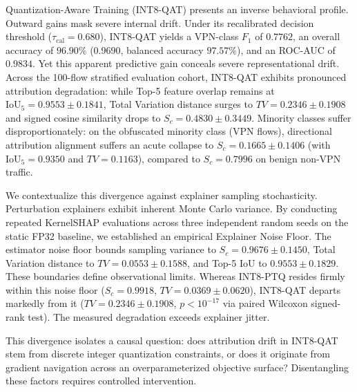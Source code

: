 \documentclass[conference]{IEEEtran}
\begin{document}
Quantization-Aware Training (INT8-QAT) presents an inverse behavioral profile. Outward gains mask severe internal drift. Under its recalibrated decision threshold ($\tau_{\text{cal}} = 0.680$), INT8-QAT yields a VPN-class $F_1$ of $0.7762$, an overall accuracy of $96.90\%$ ($0.9690$, balanced accuracy $97.57\%$), and an ROC-AUC of $0.9834$. Yet this apparent predictive gain conceals severe representational drift. Across the 100-flow stratified evaluation cohort, INT8-QAT exhibits pronounced attribution degradation: while Top-5 feature overlap remains at $\text{IoU}_5 = 0.9553 \pm 0.1841$, Total Variation distance surges to $TV = 0.2346 \pm 0.1908$ and signed cosine similarity drops to $S_c = 0.4830 \pm 0.3449$. Minority classes suffer disproportionately: on the obfuscated minority class (VPN flows), directional attribution alignment suffers an acute collapse to $S_c = 0.1665 \pm 0.1406$ (with $\text{IoU}_5 = 0.9350$ and $TV = 0.1163$), compared to $S_c = 0.7996$ on benign non-VPN traffic.

We contextualize this divergence against explainer sampling stochasticity. Perturbation explainers exhibit inherent Monte Carlo variance. By conducting repeated KernelSHAP evaluations across three independent random seeds on the static FP32 baseline, we established an empirical Explainer Noise Floor. The estimator noise floor bounds sampling variance to $S_c = 0.9676 \pm 0.1450$, Total Variation distance to $TV = 0.0553 \pm 0.1588$, and Top-5 IoU to $0.9553 \pm 0.1829$. These boundaries define observational limits. Whereas INT8-PTQ resides firmly within this noise floor ($S_c = 0.9918$, $TV = 0.0369 \pm 0.0620$), INT8-QAT departs markedly from it ($TV = 0.2346 \pm 0.1908$, $p < 10^{-17}$ via paired Wilcoxon signed-rank test). The measured degradation exceeds explainer jitter.

This divergence isolates a causal question: does attribution drift in INT8-QAT stem from discrete integer quantization constraints, or does it originate from gradient navigation across an overparameterized objective surface? Disentangling these factors requires controlled intervention.
\end{document}
